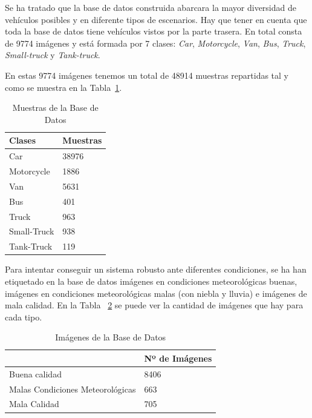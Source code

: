 Se ha tratado que la base de datos construida abarcara la mayor diversidad de vehículos posibles y en diferente tipos de escenarios. Hay que tener en cuenta que toda la base de datos tiene vehículos vistos por la parte trasera. En total consta de 9774 imágenes y está formada por 7 clases: \textit{Car}, \textit{Motorcycle}, \textit{Van}, \textit{Bus}, \textit{Truck}, \textit{Small-truck} y \textit{Tank-truck}.


En estas 9774 imágenes tenemos un total de 48914 muestras repartidas tal y como se muestra en la Tabla~\ref{tabla_muestras}.

\begin{table}[htbp] 
\begin{center}
\begin{tabular}{|l|l|}
\hline
Clases & Muestras \\
\hline \hline
Car & 38976 \\ \hline
Motorcycle & 1886 \\ \hline
Van & 5631 \\ \hline
Bus & 401 \\ \hline
Truck & 963 \\ \hline
Small-Truck & 938 \\ \hline
Tank-Truck & 119 \\ \hline
\end{tabular}
\caption{Muestras de la Base de Datos}
\label{tabla_muestras}
\end{center}
\end{table}

Para intentar conseguir un sistema robusto ante diferentes condiciones, se ha han etiquetado en la base de datos imágenes en condiciones meteorológicas buenas, imágenes en condiciones meteorológicas malas (con niebla y lluvia) e imágenes de mala calidad. En la Tabla ~\ref{tabla_img_base_datos} se puede ver la cantidad de imágenes que hay para cada tipo.
\begin{table}[htb]
\begin{center}
\begin{tabular}{|l|l|}
\hline
\cline{2-2}& Nº de Imágenes\\
\hline \hline
Buena calidad & 8406 \\ \hline
Malas Condiciones Meteorológicas & 663\\ \hline
Mala Calidad & 705\\ \hline
\end{tabular}
\caption{Imágenes de la Base de Datos}
\label{tabla_img_base_datos}
\end{center}
\end{table}

